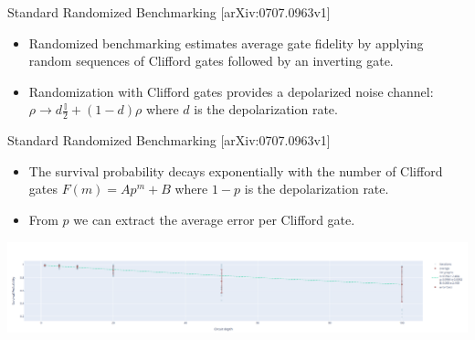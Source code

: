 \documentclass[aspectratio=169,10pt]{beamer}
\begin{document}
\begin{frame}[t,fragile]{Standard Randomized Benchmarking \hfill{\small[arXiv:0707.0963v1]}}

  \begin{itemize}
    \item<1-> Randomized benchmarking estimates average gate fidelity by applying random sequences of Clifford gates followed by an inverting gate.
    \item<1-> Randomization with Clifford gates provides a depolarized noise channel: $\rho \rightarrow d \frac{\mathbb{I}}{2} + (1-d)\rho$ where $d$ is the depolarization rate.
  \end{itemize}

  \vspace{3mm}
\end{frame}

\begin{frame}[t,fragile]{Standard Randomized Benchmarking \hfill{\small[arXiv:0707.0963v1]}}
  \begin{itemize}
    \item<1-> The survival probability decays exponentially with the number of Clifford gates $F(m) = Ap^m + B$ where $1-p$ is the depolarization rate.\\
    \item<1-> From $p$ we can extract the average error per Clifford gate.\\
  \end{itemize}

  \begin{center}
    \vspace{0.5em}
    \includegraphics[width=\textwidth]{figures/rb.png}\\
    \vspace{1.25em}
  \end{center}
\end{frame}
\end{document}
